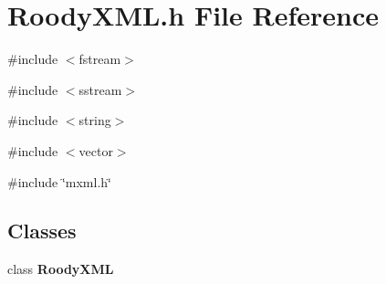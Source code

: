 \section{RoodyXML.h File Reference}
\label{RoodyXML_8h}
{\ttfamily \#include $<$fstream$>$}\par
{\ttfamily \#include $<$sstream$>$}\par
{\ttfamily \#include $<$string$>$}\par
{\ttfamily \#include $<$vector$>$}\par
{\ttfamily \#include \char`\"{}mxml.h\char`\"{}}\par
\subsection*{Classes}
\begin{DoxyCompactItemize}
\item 
class {\bf RoodyXML}
\end{DoxyCompactItemize}
